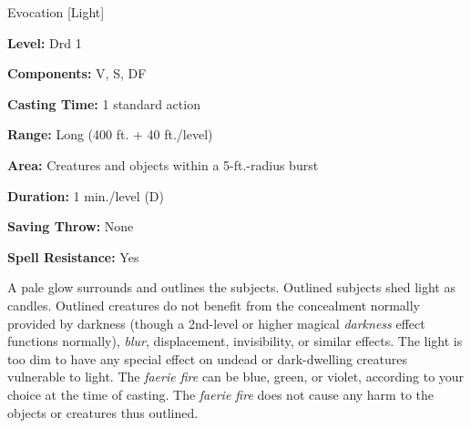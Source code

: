 
Evocation [Light]

\textbf{Level:} Drd 1

\textbf{Components:} V, S, DF

\textbf{Casting Time:} 1 standard action

\textbf{Range:} Long (400 ft. + 40 ft./level)

\textbf{Area:} Creatures and objects within a 5-ft.-radius burst

\textbf{Duration:} 1 min./level (D)

\textbf{Saving Throw:} None

\textbf{Spell Resistance:} Yes

A pale glow surrounds and outlines the subjects. Outlined subjects shed light as 
candles. Outlined creatures do not benefit from the concealment normally provided 
by darkness (though a 2nd-level or higher magical \textit{darkness} effect functions 
normally), \textit{blur}, displacement, invisibility, or similar effects. The light 
is too dim to have any special effect on undead or dark-dwelling creatures vulnerable 
to light. The \textit{faerie fire} can be blue, green, or violet, according to 
your choice at the time of casting. The \textit{faerie fire} does not cause any 
harm to the objects or creatures thus outlined.

